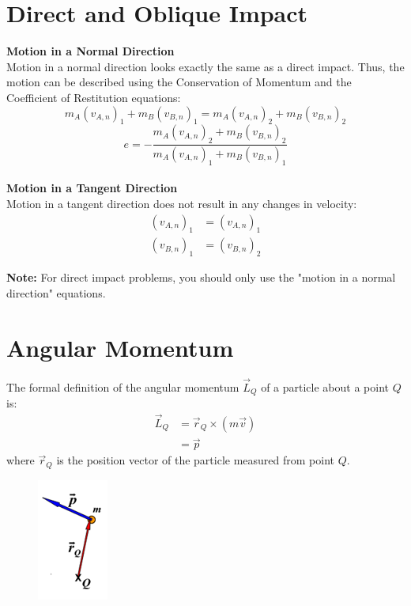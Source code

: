\documentclass{article}
\begin{document}
\section*{Direct and Oblique Impact}

\textbf{Motion in a Normal Direction} \\
Motion in a normal direction looks exactly the same as a direct impact. Thus, the motion can be described using the Conservation of Momentum and the Coefficient of Restitution equations:
\begin{equation*}
    m_A \left(v_{A, n} \right)_1 + m_B \left( v_{B, n} \right)_1 = m_A \left(v_{A, n} \right)_2 + m_B \left( v_{B, n} \right)_2
\end{equation*}
\begin{equation*}
    e = -\frac{m_A \left(v_{A, n} \right)_2 + m_B \left( v_{B, n} \right)_2}{m_A \left(v_{A, n} \right)_1 + m_B \left( v_{B, n} \right)_1}
\end{equation*} \\

\textbf{Motion in a Tangent Direction} \\
Motion in a tangent direction does not result in any changes in velocity:
\begin{align*}
    \left(v_{A, n} \right)_1 &= \left(v_{A, n} \right)_1 \\
    \left(v_{B, n} \right)_1 &= \left(v_{B, n} \right)_2
\end{align*}

\textbf{Note:} For direct impact problems, you should only use the "motion in a normal direction" equations.

\clearpage


\section*{Angular Momentum}

The formal definition of the angular momentum $\vec{L}_Q$ of a particle about a point $Q$ is:
\begin{align*}
    \vec{L}_Q &= \vec{r}_Q \times \left( m \vec{v} \right) \\
              &= \vec{p}
\end{align*}
where $\vec{r}_Q$ is the position vector of the particle measured from point $Q$.

\begin{figure}[h]
    \includegraphics[scale=0.7]{angular_momentum_no_text}
    \centering
\end{figure}
\end{document}
